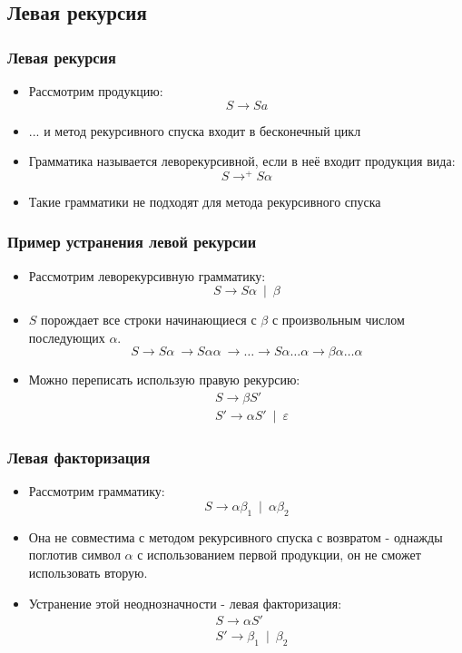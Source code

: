 \documentclass[16pt,pdf,unicode]{beamer}
\begin{document}
\subsection{Левая рекурсия}
\begin{frame}
\frametitle{Левая рекурсия}
\begin{itemize}
  \item Рассмотрим продукцию:
    $$ S \rightarrow Sa $$
  \item ... и метод рекурсивного спуска входит в бесконечный цикл
  \item Грамматика называется леворекурсивной, если в неё входит продукция вида:
    $$ S \rightarrow^+ S\alpha $$
  \item Такие грамматики не подходят для метода рекурсивного спуска
\end{itemize}
\end{frame}

\begin{frame}
\frametitle{Пример устранения левой рекурсии}
\begin{itemize}
  \item Рассмотрим леворекурсивную грамматику:
    $$ S \rightarrow S\alpha \: \mid \: \beta  $$ 
  \item $S$ порождает все строки начинающиеся с $\beta$ с произвольным числом последующих $\alpha$.
    $$ S \rightarrow S\alpha \: \rightarrow S\alpha\alpha \: \rightarrow \dots \rightarrow S\alpha\dots\alpha \rightarrow \beta\alpha\dots\alpha $$ 
  \item Можно переписать использую правую рекурсию:
    \begin{align*}
      &S \rightarrow \beta S' \\
      &S' \rightarrow \alpha S' \: \mid \: \varepsilon
    \end{align*}
  
\end{itemize}
\end{frame}

\begin{frame}
\frametitle{Левая факторизация}
\begin{itemize}
  \item Рассмотрим грамматику:
    $$ S \rightarrow \alpha\beta_1 \: \mid \: \alpha\beta_2  $$ 
  \item Она не совместима с методом рекурсивного спуска с возвратом - однажды поглотив символ $\alpha$ с использованием первой продукции, он не сможет использовать вторую.
  \item Устранение этой неоднозначности - левая факторизация:
    \begin{align*}
      &S \rightarrow \alpha S' \\
      &S' \rightarrow \beta_1 \: \mid \: \beta_2
    \end{align*}
  
\end{itemize}
\end{frame}
\end{document}

